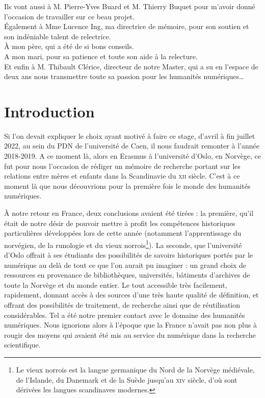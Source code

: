 \documentclass[a4paper,12pt,twoside]{book}
\begin{document}
	
	Ils vont aussi à M. Pierre-Yves Buard et M. Thierry Buquet pour m'avoir donné l'occasion de travailler sur ce beau projet.\\
	
	
	Également à Mme Lucence Ing, ma directrice de mémoire, pour son soutien et son indéniable talent de relectrice.\\
	
	
	À mon père, qui a été de si bons conseils.\\
	
	
	A mon mari, pour sa patience et toute son aide à la relecture.\\
	
	
	Et enfin à M. Thibault Clérice, directeur de notre Master, qui a su en l'espace de deux ans nous transmettre toute sa passion pour les humanités numériques\dots
	
	
	\chapter{Introduction}
Si l'on devait expliquer le choix ayant motivé à faire ce stage, d'avril à fin juillet 2022, au sein du \acrfull{PDN} de l'université de Caen, il nous faudrait remonter à l'année 2018-2019. A ce moment là, alors en Erasmus à l'université d'Oslo, en Norvège, ce fut pour nous l'occasion de rédiger un mémoire de recherche portant sur les relations entre mères et enfants dans la Scandinavie du \textsc{xii}\ieme{} siècle. C'est à ce moment là que nous découvrions pour la première fois le monde des humanités numériques.

À notre retour en France, deux conclusions avaient été tirées : la première, qu'il était de notre désir de pouvoir mettre à profit les compétences historiques particulières développées lors de cette année (notamment l'apprentissage du norvégien, de la runologie et du vieux norrois\footnote{Le vieux norrois est la langue germanique du Nord de la Norvège médiévale, de l'Islande, du Danemark et de la Suède jusqu'au \textsc{xiv}\ieme{} siècle, d'où sont dérivées les langues scandinaves modernes.}). La seconde, que l'université d'Oslo offrait à ses étudiants des possibilités de savoirs historiques portés par le numérique au delà de tout ce que l'on aurait pu imaginer : un grand choix de ressources en provenance de bibliothèques, universités, bâtiments d'archives de toute la Norvège et du monde entier. Le tout accessible très facilement, rapidement, donnant accès à des sources d'une très haute qualité de définition, et offrant des possibilités de traitement, de recherche ainsi que de réutilisation considérables. Tel a été notre premier contact avec le domaine des humanités numériques. Nous ignorions alors à l'époque que la France n'avait pas non plus à rougir des moyens qui avaient été mis au service du numérique dans la recherche scientifique.
\end{document}
